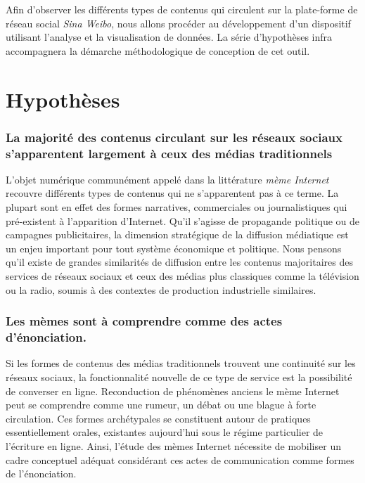 Afin d'observer les différents types de contenus qui circulent sur la plate-forme de réseau social \textit{Sina Weibo}, nous allons procéder au développement d'un dispositif utilisant l'analyse et la visualisation de données. La série d'hypothèses infra accompagnera la démarche méthodologique de conception de cet outil.

\section*{Hypothèses}
\label{sec:hypotheses}

\subsubsection{La majorité des contenus circulant sur les réseaux sociaux s'apparentent largement à ceux des médias traditionnels} 

L'objet numérique communément appelé dans la littérature \textit{mème Internet} recouvre différents types de contenus qui ne s'apparentent pas à ce terme. La plupart sont en effet des formes narratives, commerciales ou journalistiques qui pré-existent à l'apparition d'Internet. Qu{\textquoteright}il s{\textquoteright}agisse de propagande politique ou de campagnes publicitaires, la dimension stratégique de la diffusion médiatique est un enjeu important pour tout système économique et politique. Nous pensons qu{\textquoteright}il existe de grandes similarités de diffusion entre les contenus majoritaires des services de réseaux sociaux et ceux des médias plus classiques comme la télévision ou la radio, soumis à des contextes de production industrielle similaires.

\subsubsection{Les mèmes sont à comprendre comme des actes d'énonciation.}

Si les formes de contenus des médias traditionnels trouvent une continuité sur les réseaux sociaux, la fonctionnalité nouvelle de ce type de service est la possibilité de converser en ligne. Reconduction de phénomènes anciens le mème Internet peut se comprendre comme une rumeur, un débat ou une blague à forte circulation. Ces formes archétypales se constituent autour de pratiques essentiellement orales, existantes aujourd'hui sous le régime particulier de l'écriture en ligne. Ainsi, l'étude des mèmes Internet nécessite de mobiliser un cadre conceptuel adéquat considérant ces actes de communication comme formes de l'énonciation.


